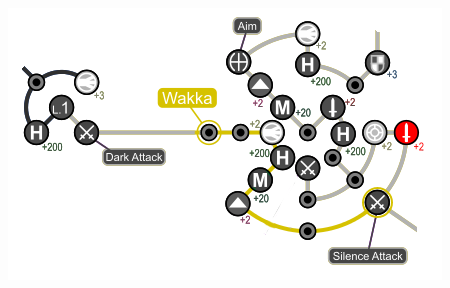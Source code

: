 \begin{spheregrid}
\begin{itemize}
\begin{itemize}
		\end{itemize}
		\includegraphics[width=.9\columnwidth]{graphics/Wakka_Grid}
	\end{itemize}
\end{spheregrid}
\vfill

